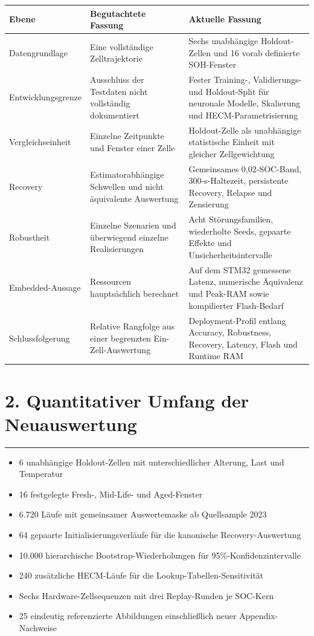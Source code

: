 \documentclass[10pt,a4paper]{article}
\newcommand{\sectionrule}{\vspace{-2pt}\color{tured}\rule{\textwidth}{0.7pt}\color{black}\vspace{2pt}}
\begin{document}
\begin{table}[h]
\small
\begin{tabularx}{\textwidth}{P{3.2cm}YY}
\toprule
\textbf{Ebene} & \textbf{Begutachtete Fassung} & \textbf{Aktuelle Fassung} \\
\midrule
Datengrundlage & Eine vollständige Zelltrajektorie & Sechs unabhängige Holdout-Zellen und 16 vorab definierte SOH-Fenster \\
Entwicklungsgrenze & Ausschluss der Testdaten nicht vollständig dokumentiert & Fester Training-, Validierungs- und Holdout-Split für neuronale Modelle, Skalierung und HECM-Parametrisierung \\
Vergleichseinheit & Einzelne Zeitpunkte und Fenster einer Zelle & Holdout-Zelle als unabhängige statistische Einheit mit gleicher Zellgewichtung \\
Recovery & Estimatorabhängige Schwellen und nicht äquivalente Auswertung & Gemeinsames 0,02-SOC-Band, 300-s-Haltezeit, persistente Recovery, Relapse und Zensierung \\
Robustheit & Einzelne Szenarien und überwiegend einzelne Realisierungen & Acht Störungsfamilien, wiederholte Seeds, gepaarte Effekte und Unsicherheitsintervalle \\
Embedded-Aussage & Ressourcen hauptsächlich berechnet & Auf dem STM32 gemessene Latenz, numerische Äquivalenz und Peak-RAM sowie kompilierter Flash-Bedarf \\
Schlussfolgerung & Relative Rangfolge aus einer begrenzten Ein-Zell-Auswertung & Deployment-Profil entlang Accuracy, Robustness, Recovery, Latency, Flash und Runtime RAM \\
\bottomrule
\end{tabularx}
\end{table}

\section*{2. Quantitativer Umfang der Neuauswertung}
\sectionrule

\begin{itemize}
\item 6 unabhängige Holdout-Zellen mit unterschiedlicher Alterung, Last und Temperatur
\item 16 festgelegte Fresh-, Mid-Life- und Aged-Fenster
\item 6.720 Läufe mit gemeinsamer Auswertemaske ab Quellsample 2023
\item 64 gepaarte Initialisierungsverläufe für die kanonische Recovery-Auswertung
\item 10.000 hierarchische Bootstrap-Wiederholungen für 95\%-Konfidenzintervalle
\item 240 zusätzliche HECM-Läufe für die Lookup-Tabellen-Sensitivität
\item Sechs Hardware-Zellsequenzen mit drei Replay-Runden je SOC-Kern
\item 25 eindeutig referenzierte Abbildungen einschließlich neuer Appendix-Nachweise
\end{itemize}
\end{document}
